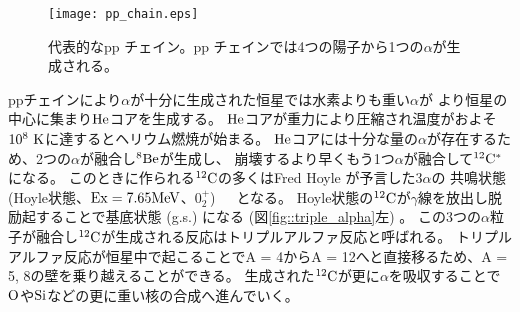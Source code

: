 \documentclass[../master]{subfiles}
\begin{document}
\begin{figure}
  \centering
  \texttt{[image: pp\_chain.eps]}
  \caption{代表的なpp チェイン。pp チェインでは4つの陽子から1つの$\alpha$が生成される。}
  \label{fig::pp_chain}
\end{figure}

ppチェインにより$\alpha$が十分に生成された恒星では水素よりも重い$\alpha$が
より恒星の中心に集まり${\rm He}$コアを生成する。
${\rm He}$コアが重力により圧縮され温度がおよそ$10^8~{\rm K}$に達するとヘリウム燃焼が始まる。
${\rm He}$コアには十分な量の$\alpha$が存在するため、2つの$\alpha$が融合し${}^{8}{\rm Be}$が生成し、
崩壊するより早くもう1つ$\alpha$が融合して${}^{12}{\rm C}^{*}$になる。
このときに作られる${}^{12}{\rm C}$の多くはFred Hoyle が予言した$3\alpha$の
共鳴状態 (Hoyle状態、${\rm Ex} = 7.65{\rm MeV}$、$0_{2}^{+}$)~\cite{hoyle_state}　となる。
Hoyle状態の${}^{12}{\rm C}$が$\gamma$線を放出し脱励起することで基底状態 (g.s.) になる (図\ref{fig::triple_alpha}左) 。
この3つの$\alpha$粒子が融合し${}^{12}{\rm C}$が生成される反応はトリプルアルファ反応と呼ばれる。
トリプルアルファ反応が恒星中で起こることでA = 4からA = 12へと直接移るため、A = 5, 8の壁を乗り越えることができる。
生成された${}^{12}{\rm C}$が更に$\alpha$を吸収することで${\rm O}$や${\rm Si}$などの更に重い核の合成へ進んでいく。
\end{document}
